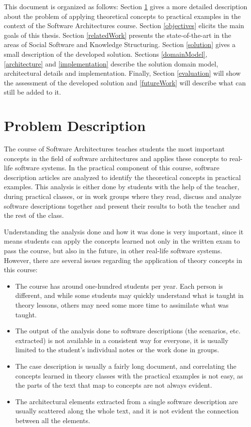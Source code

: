 \documentclass[conference]{IEEEtran}
\begin{document}
This document is organized as follows: Section \ref{problemDescription} gives a more detailed description about the problem of applying theoretical concepts to practical examples in the context of the Software Architectures course. Section \ref{objectives} elicits the main goals of this thesis. Section \ref{relatedWork} presents the state-of-the-art in the areas of Social Software and Knowledge Structuring. Section \ref{solution} gives a small description of the developed solution. Sections \ref{domainModel}, \ref{architecture} and \ref{implementation} describe the solution domain model, architectural details and implementation. Finally, Section \ref{evaluation} will show the assessment of the developed solution and \ref{futureWork} will describe what can still be added to it.

\section{Problem Description}
\label{problemDescription}
The course of Software Architectures teaches students the most important concepts in the field of software architectures and applies these concepts to real-life software systems. In the practical component of this course, software description articles are analyzed to identify the theoretical concepts in practical examples. This analysis is either done by students with the help of the teacher, during practical classes, or in work groups where they read, discuss and analyze software descriptions together and present their results to both the teacher and the rest of the class.

Understanding the analysis done and how it was done is very important, since it means students can apply the concepts learned not only in the written exam to pass the course, but also in the future, in other real-life software systems. However, there are several issues regarding the application of theory concepts in this course:
\begin{itemize}
\item The course has around one-hundred students per year. Each person is different, and while some students may quickly understand what is taught in theory lessons, others may need some more time to assimilate what was taught.

\item The output of the analysis done to software descriptions (the scenarios, etc. extracted) is not available in a consistent way for everyone, it is usually limited to the student's individual notes or the work done in groups.

\item The case description is usually a fairly long document, and correlating the concepts learned in theory classes with the practical examples is not easy, as the parts of the text that map to concepts are not always evident.

\item The architectural elements extracted from a single software description are usually scattered along the whole text, and it is not evident the connection between all the elements.
\end{itemize}
\end{document}
